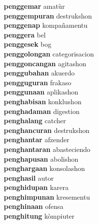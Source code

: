 \textbf{penggemar } amatùr \\
\textbf{penggempuran } destrukshon \\
\textbf{penggenap } kompañamentu \\
\textbf{penggera } bel \\
\textbf{penggesek } bog \\
\textbf{penggolongan } categorisacion \\
\textbf{penggoncangan } agitashon \\
\textbf{penggubahan } akuerdo \\
\textbf{pengguguran } frakaso \\
\textbf{penggunaan } aplikashon \\
\textbf{penghabisan } konklushon \\
\textbf{penghadaman } digestion \\
\textbf{penghalang } catcher \\
\textbf{penghancuran } destrukshon \\
\textbf{penghantar } afzender \\
\textbf{penghantaran } abasteciendo \\
\textbf{penghapusan } abolishon \\
\textbf{penghargaan } konsolashon \\
\textbf{penghasil } autor \\
\textbf{penghidupan } karera \\
\textbf{penghimpunan } kresementu \\
\textbf{penghinaan } ofensa \\
\textbf{penghitung } kòmpiuter \\
